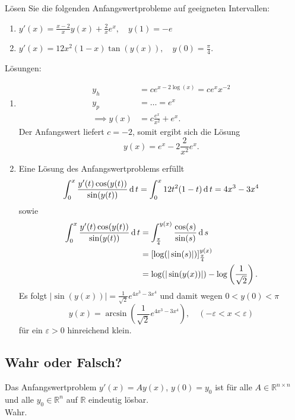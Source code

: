 \documentclass[parskip=full]{scrartcl}
\begin{document}
Lösen Sie die folgenden Anfangswertprobleme auf geeigneten Intervallen:
\begin{enumerate}
    \item $y'(x) = \frac{x - 2}{x} y(x) + \frac{2}{x}e^x, \quad y(1) = -e$
    \item $y'(x) = 12x^2(1 - x) \tan(y(x)), \quad y(0) = \frac{\pi}{4}$.
\end{enumerate}
Lösungen:
\begin{enumerate}
    \item 
    \begin{align*}
      y_h &= ce^{x - 2\log(x)} = ce^x x^{-2}\\
      y_p &= \dots = e^x\\
      \implies y(x) &= c\frac{e^x}{x^2} + e^x.
    \end{align*}
    Der Anfangswert liefert $c = -2$, somit ergibt sich die Lösung
\begin{displaymath}
  y(x) = e^x - 2\frac{2}{x^2}e^x.
\end{displaymath}
  \item
  Eine Lösung des Anfangswertproblems erfüllt
  \begin{displaymath}
    \int_0^x \frac{y'(t) \cos(y(t))}{\sin(y(t))} \operatorname{\mathop{}\!\mathrm{d}} t = \int_0^x 12t^2(1 - t) \operatorname{\mathop{}\!\mathrm{d}} t = 4x^3 - 3x^4 
  \end{displaymath}
  sowie
  \begin{align*}
    \int_0^x \frac{y'(t) \cos(y(t))}{\sin(y(t))} \operatorname{\mathop{}\!\mathrm{d}} t &= \int_{\frac{\pi}{4}}^{y(x)} \frac{\cos(s)}{\sin(s)} \operatorname{\mathop{}\!\mathrm{d}} s\\
    &= [\log(|\sin(s)|)]_{\frac{\pi}{4}}^{y(x)}\\
    &= \log(|\sin(y(x))|) - \log\left(\frac{1}{\sqrt{2}}\right).
  \end{align*}
  Es folgt $|\sin(y(x))| = \frac{1}{\sqrt{2}} e^{4x^3 - 3x^4}$ und damit wegen $0 < y(0) < \pi$
  \begin{displaymath}
    y(x) = \arcsin\left(\frac{1}{\sqrt{2}}e^{4x^3 - 3x^4}\right), \quad (-\varepsilon < x < \varepsilon)
  \end{displaymath}
  für ein $\varepsilon > 0$ hinreichend klein.
\end{enumerate}

\subsection{Wahr oder Falsch?}
Das Anfangswertproblem $y'(x) = Ay(x)$, $y(0) = y_0$ ist für alle $A \in \mathbb{R}^{n \times n}$ und alle $y_0 \in \mathbb{R}^n$ auf $\mathbb{R}$ eindeutig lösbar.\\
Wahr.
\end{document}
